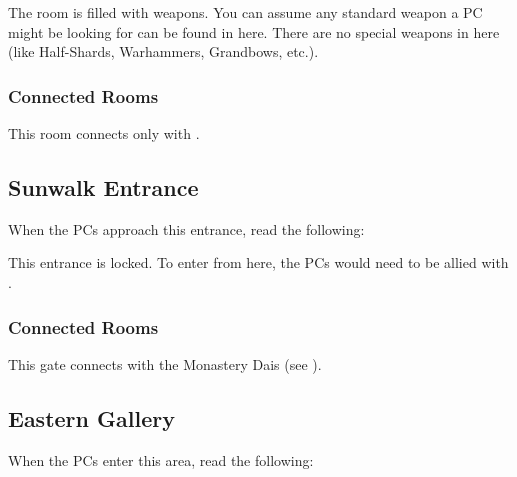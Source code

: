 The room is filled with weapons. You can assume any standard weapon a PC might be looking for can be found in here. There are no special weapons in here (like Half-Shards, Warhammers, Grandbows, etc.).

\subsubsection{Connected Rooms}

This room connects only with .





\subsection{Sunwalk Entrance}
\label{ssec:kholinarPalaceRoomsSunwalk}

When the PCs approach this entrance, read the following:


This entrance is locked. To enter from here, the PCs would need to be allied with \npcFractionCult{}.

\subsubsection{Connected Rooms}

This gate connects  with the Monastery Dais (see ).





\subsection{Eastern Gallery}
\label{ssec:kholinarPalaceRoomsEasternGallery}

When the PCs enter this area, read the following:



